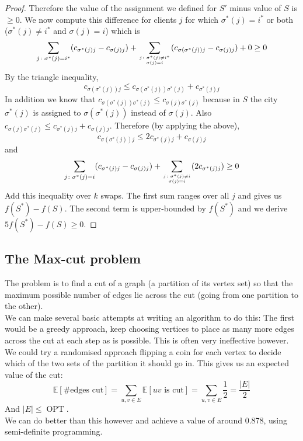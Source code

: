 \documentclass{article}
\theoremstyle{definition}
\newcommand{\bb}[1]{\mathbb{#1}}
\DeclareMathOperator{\OPT}{OPT}
\begin{document}
\begin{proof}
Therefore the value of the assignment we defined for $S'$ minus value of $S$ is $\ge 0$.
We now compute this difference for clients $j$ for which $\sigma^*(j) = i^*$ or both ($\sigma^*(j) \ne i^*$ and $\sigma(j) = i$) which is
$$\sum_{j\colon \sigma^*(j) = i^*} (c_{\sigma^*(j)j} - c_{\sigma(j)j}) + \sum_{j\colon \sigma^*(j) \ne i^* \atop \sigma(j) = i} (c_{\sigma(\sigma^*(j))j} - c_{\sigma(j)j}) + 0 \ge 0$$
By the triangle inequality, 
$$c_{\sigma(\sigma^*(j))j}\le c_{\sigma(\sigma^*(j))\sigma^*(j)} + c_{\sigma^*(j)j}$$
In addition we know that $c_{\sigma(\sigma^*(j))\sigma^*(j)}\le c_{\sigma(j)\sigma^*(j)}$ because in $S$ the city $\sigma^*(j)$ is assigned to $\sigma(\sigma^*(j))$ instead of $\sigma(j)$.
Also $c_{\sigma(j)\sigma^*(j)}\le c_{\sigma^*(j)j} + c_{\sigma(j)j}$.
Therefore (by applying the above),
$$c_{\sigma(\sigma^*(j))j}\le 2c_{\sigma^*(j)j}+c_{\sigma(j)j}$$
and
$$\sum_{j\colon \sigma^*(j)=i} (c_{\sigma^*(j)j} - c_{\sigma(j)j}) + \sum_{j\colon \sigma^*(j)\ne i \atop \sigma(j) = i} (2c_{\sigma^*(j)j})\ge 0$$
Add this inequality over $k$ swaps.
The first sum ranges over all $j$ and gives us $f(S^*) - f(S)$.
The second term is upper-bounded by $f(S^*)$ and we derive $5f(S^*) - f(S) \ge 0$.
\end{proof}


\subsection{The Max-cut problem}

The problem is to find a cut of a graph (a partition of its vertex set) so that the maximum possible number of edges lie across the cut (going from one partition to the other).\\
We can make several basic attempts at writing an algorithm to do this:
The first would be a greedy approach, keep choosing vertices to place as many more edges across the cut at each step as is possible.
This is often very ineffective however. \\
We could try a randomised approach flipping a coin for each vertex to decide which of the two sets of the partition it should go in.
This gives us an expected value of the cut:
$$\bb E[\#\text{edges cut}] = \sum_{u,v\in E}\bb E[uv\text{ is cut}] = \sum_{u,v\in E} \frac{1}{2} = \frac{|E|}{2}$$
And $|E|\le \OPT$. \\
We can do better than this however and achieve a value of around 0.878, using semi-definite programming.
\end{document}
